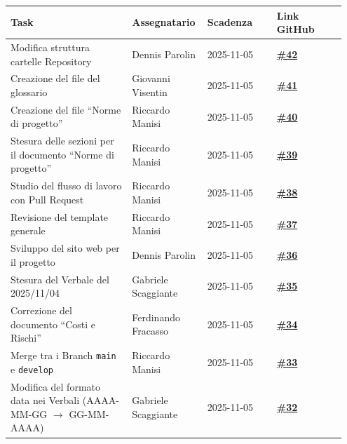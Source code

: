 \documentclass[a4paper,12pt]{article}
\begin{document}
\begin{center}
    \small
    \renewcommand{\arraystretch}{1.2} 
    \begin{tabular}{|p{0.35\linewidth}|p{0.2\linewidth}|p{0.2\linewidth}|p{0.2\linewidth}|}
        \hline
        \rowcolor{gray!60} 
        \textbf{Task} & \textbf{Assegnatario} & \textbf{Scadenza} & \textbf{Link GitHub} \\
        \hline
        \rowcolor{white}
        Modifica struttura cartelle Repository & Dennis Parolin & 2025-11-05 & \href{https://github.com/SWE-BitByBit/SWE-project/issues/42}{\textbf{\#42}} \\
        \hline
        \rowcolor{gray!20}
        Creazione del file del glossario & Giovanni Visentin & 2025-11-05 & \href{https://github.com/SWE-BitByBit/SWE-project/issues/41}{\textbf{\#41}} \\
        \hline
        \rowcolor{white}
        Creazione del file “Norme di progetto” & Riccardo Manisi & 2025-11-05 & \href{https://github.com/SWE-BitByBit/SWE-project/issues/40}{\textbf{\#40}} \\
        \hline
        \rowcolor{gray!20}
        Stesura delle sezioni per il documento “Norme di progetto” & Riccardo Manisi & 2025-11-05 & \href{https://github.com/SWE-BitByBit/SWE-project/issues/39}{\textbf{\#39}} \\
        \hline
        \rowcolor{white}
        Studio del flusso di lavoro con Pull Request & Riccardo Manisi & 2025-11-05 & \href{https://github.com/SWE-BitByBit/SWE-project/issues/38}{\textbf{\#38}} \\
        \hline
        \rowcolor{gray!20}
        Revisione del template generale & Riccardo Manisi & 2025-11-05 & \href{https://github.com/SWE-BitByBit/SWE-project/issues/37}{\textbf{\#37}} \\
        \hline
        \rowcolor{white}
        Sviluppo del sito web per il progetto & Dennis Parolin & 2025-11-05 & \href{https://github.com/SWE-BitByBit/SWE-project/issues/36}{\textbf{\#36}} \\
        \hline
        \rowcolor{gray!20}
        Stesura del Verbale del 2025/11/04 & Gabriele Scaggiante & 2025-11-05 & \href{https://github.com/SWE-BitByBit/SWE-project/issues/35}{\textbf{\#35}} \\
        \hline
        \rowcolor{white}
        Correzione del documento “Costi e Rischi” & Ferdinando Fracasso & 2025-11-05 & \href{https://github.com/SWE-BitByBit/SWE-project/issues/34}{\textbf{\#34}} \\
        \hline
        \rowcolor{gray!20}
        Merge tra i Branch \texttt{main} e \texttt{develop} & Riccardo Manisi & 2025-11-05 & \href{https://github.com/SWE-BitByBit/SWE-project/issues/33}{\textbf{\#33}} \\
        \hline
        \rowcolor{white}
        Modifica del formato data nei Verbali (AAAA-MM-GG $\rightarrow$ GG-MM-AAAA) & Gabriele Scaggiante & 2025-11-05 & \href{https://github.com/SWE-BitByBit/SWE-project/issues/32}{\textbf{\#32}} \\
        \hline
    \end{tabular}
\end{center}
\end{document}
